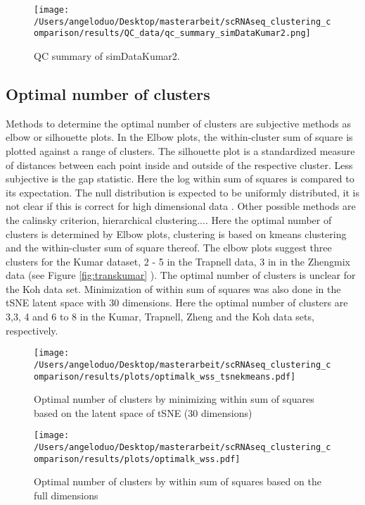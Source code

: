\documentclass[11pt, a4paper]{article}\usepackage[]{graphicx}\usepackage[]{color}
\begin{document}
\begin{figure}[!h]
\texttt{[image: /Users/angeloduo/Desktop/masterarbeit/scRNAseq\_clustering\_comparison/results/QC\_data/qc\_summary\_simDataKumar2.png]}
\caption{QC summary of simDataKumar2. }
\label{fig:simDataKumar}
\end{figure}


\subsection{Optimal number of clusters}
Methods to determine the optimal number of clusters are subjective methods as elbow or silhouette plots. In the Elbow plots, the within-cluster sum of square is plotted against a range of clusters. The silhouette plot is a standardized measure of distances between each point inside and outside of the respective cluster. Less subjective is the gap statistic. Here the log within sum of squares is compared to its expectation. The null distribution is expected to be uniformly distributed, it is not clear if this is correct for high dimensional data \citep{tibshirani2001estimating}. Other possible methods are the calinsky criterion, hierarchical clustering....
Here the optimal number of clusters is determined by Elbow plots, clustering is based on kmeans clustering and the within-cluster sum of square thereof.
The elbow plots suggest three clusters for the Kumar dataset, 2 - 5 in the Trapnell data, 3 in in the Zhengmix data (see Figure \ref{fig:transkumar} ). The optimal number of clusters is unclear for the Koh data set. 
Minimization of within sum of squares was also done in the tSNE latent space with 30 dimensions. Here the optimal number of clusters are 3,3, 4 and 6 to 8  in the Kumar, Trapnell, Zheng and the Koh data sets, respectively.

\begin{figure}[!h]
\texttt{[image: /Users/angeloduo/Desktop/masterarbeit/scRNAseq\_clustering\_comparison/results/plots/optimalk\_wss\_tsnekmeans.pdf]}
\caption{Optimal number of clusters by minimizing within sum of squares based on the latent space of tSNE (30 dimensions) }
\label{fig:wsstsne}
\end{figure}

\begin{figure}[!h]
\texttt{[image: /Users/angeloduo/Desktop/masterarbeit/scRNAseq\_clustering\_comparison/results/plots/optimalk\_wss.pdf]}
\caption{Optimal number of clusters by within sum of squares based on the full dimensions }
\label{fig:wssorg}
\end{figure}
\end{document}
